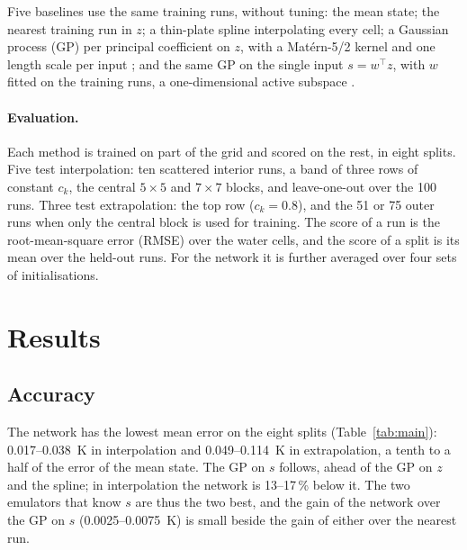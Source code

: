 \documentclass[11pt,a4paper]{article}
\begin{document}
Five baselines use the same training runs, without tuning: the mean state; the nearest training run in $z$; a
thin-plate spline interpolating every cell; a Gaussian process (GP) per principal coefficient on $z$, with a
Mat\'ern-5/2 kernel and one length scale per input \cite{rasmussen2006}; and the same GP on the single input
$s = w^\top z$, with $w$ fitted on the training runs, a one-dimensional active subspace \cite{constantine2014}.

\paragraph{Evaluation.} Each method is trained on part of the grid and scored on the rest, in eight splits.
Five test interpolation: ten scattered interior runs, a band of three rows of constant $c_k$, the central
$5\times5$ and $7\times7$ blocks, and leave-one-out over the 100 runs. Three test extrapolation: the top row
($c_k = 0.8$), and the 51 or 75 outer runs when only the central block is used for training. The score of a run
is the root-mean-square error (RMSE) over the water cells, and the score of a split is its mean over the held-out
runs. For the network it is further averaged over four sets of initialisations.

\section{Results}

\subsection{Accuracy}

\begin{table}[t]
\centering\footnotesize\setlength{\tabcolsep}{3.5pt}

\caption{RMSE (K) over the water cells, mean over the held-out runs. Network: mean over four sets of
initialisations, the range of that mean across the sets, and the median over the runs. Bold: lowest mean.}
\label{tab:main}
\end{table}

The network has the lowest mean error on the eight splits (Table~\ref{tab:main}): 0.017--\SI{0.038}{K} in
interpolation and 0.049--\SI{0.114}{K} in extrapolation, a tenth to a half of the error of the mean state. The GP
on $s$ follows, ahead of the GP on $z$ and the spline; in interpolation the network is 13--17\,\% below it. The two
emulators that know $s$ are thus the two best, and the gain of the network over the GP on $s$
(0.0025--\SI{0.0075}{K}) is small beside the gain of either over the nearest run.
\end{document}
